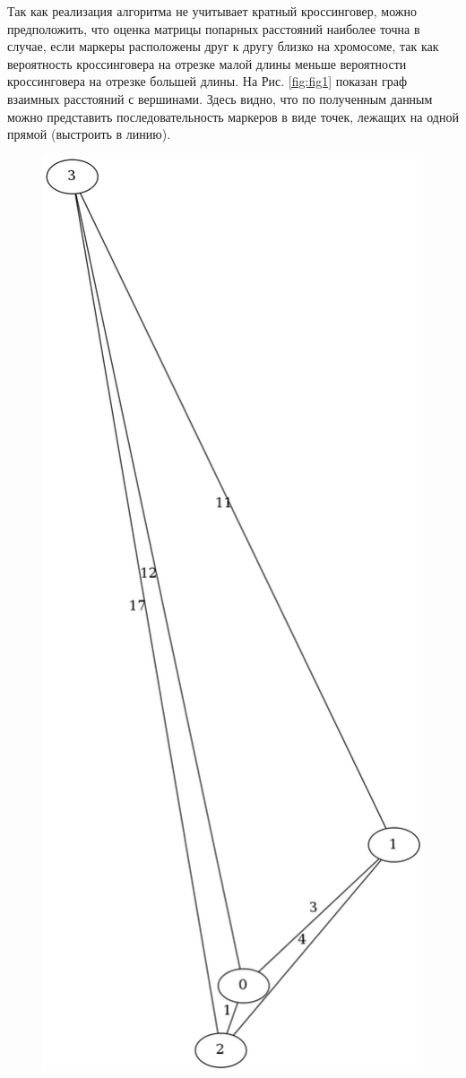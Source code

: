 \documentclass{matmex-diploma-custom}
\begin{document}
Так как реализация алгоритма не учитывает кратный кроссинговер, можно
предположить, что оценка матрицы попарных расстояний наиболее точна в
случае, если маркеры расположены друг к другу близко на хромосоме, так
как вероятность кроссинговера на отрезке малой длины меньше
вероятности кроссинговера на отрезке большей длины. На
Рис. \ref{fig:fig1} показан граф взаимных расстояний с
вершинами. Здесь видно, что по полученным данным можно представить
последовательность маркеров в виде точек, лежащих на одной прямой
(выстроить в линию).
\begin{figure}[h]
 \centering
  \includegraphics[width=1.0\textwidth]{good.png}

\end{figure}
\end{document}

